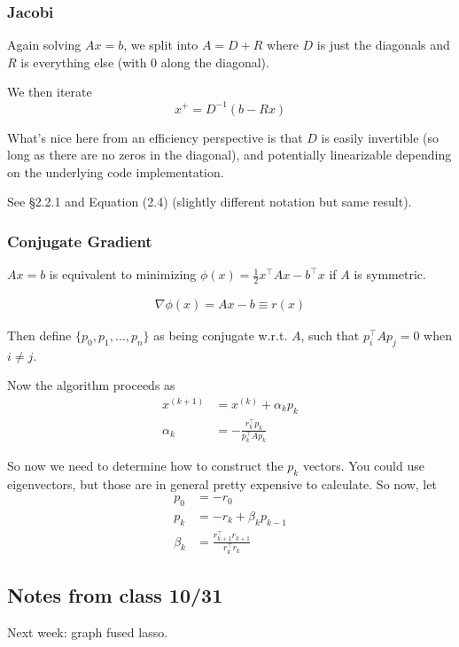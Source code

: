 \documentclass{article}
\begin{document}
\subsubsection{Jacobi}
Again solving $Ax=b$, we split into $A=D+R$ where $D$ is just the diagonals and $R$ is everything else (with 0 along the diagonal).

We then iterate
$$x^+ = D^{-1} (b-Rx)$$

What's nice here from an efficiency perspective is that $D$ is easily invertible (so long as there are no zeros in the diagonal), and potentially linearizable depending on the underlying code implementation.

See \cite{barrett1994templates} \S2.2.1 and Equation (2.4) (slightly different notation but same result).


\subsubsection{Conjugate Gradient}
$Ax=b$ is equivalent to minimizing $\phi(x)=\frac{1}{2}x^\top A x -b^\top x$ if $A$ is symmetric.

\begin{align*}
\nabla \phi(x) = Ax-b \equiv r(x)
\end{align*}

Then define $\{ p_0, p_1, \ldots, p_n\}$ as being conjugate w.r.t. $A$, such that
$p_i^\top A p_j = 0$ when $i\neq j$.

Now the algorithm proceeds as
\begin{align*}
x^{(k+1)} &= x^{(k)} + \alpha_k p_k\\
\alpha_k &= -\frac{r_k^\top p_k}{p_k^\top A p_k}
\end{align*}

So now we need to determine how to construct the $p_k$ vectors. You could use eigenvectors, but those
are in general pretty expensive to calculate. So now, let
\begin{align*}
p_0 &= -r_0\\
p_k &= -r_k + \beta_k p_{k-1}\\
\beta_k &= \frac{r_{k+1}^\top r_{k+1}}{r_k^\top r_k}
\end{align*}



\subsection{Notes from class 10/31}
Next week: graph fused lasso.
\end{document}
